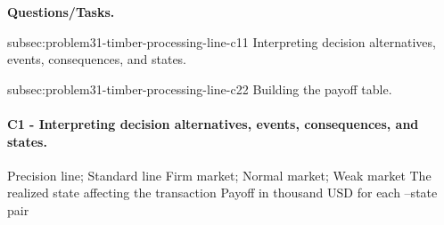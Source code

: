 	\textbf{Questions/Tasks.}
	\begin{enumerate}
	\CriterionTask
	{subsec:problem31-timber-processing-line-c1}{1}
	{Interpreting decision alternatives, events, consequences, and states.}

	\CriterionTask
	{subsec:problem31-timber-processing-line-c2}{2}
	{Building the payoff table.}
	\end{enumerate}

	\paragraph*{C1 - Interpreting decision alternatives, events, consequences, and states.}
	\label{subsec:problem31-timber-processing-line-c1}
	\DecisionElementsTable
	{Precision line; Standard line}
	{Firm market; Normal market; Weak market}
	{The realized state affecting the transaction}
	{Payoff in thousand USD for each --state pair}

